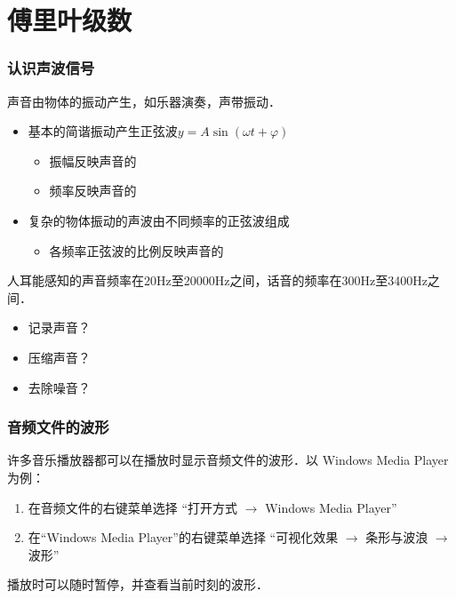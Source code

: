\documentclass[14pt,notheorems,leqno,xcolor={rgb}]{beamer} %
\begin{document}
\section{傅里叶级数}

\begin{frame}
\frametitle{认识声波信号}
声音由物体的振动产生，如乐器演奏，声带振动．\pause
\begin{itemize}
  \item 基本的简谐振动产生正弦波$y=A\sin(\omega t+\varphi)$\pause
  \begin{itemize}
    \item 振幅反映声音的%
    \item 频率\makebox[1.4em]{$\omega$}反映声音的%
  \end{itemize}\pause
  \item 复杂的物体振动的声波由不同频率的正弦波组成\pause
  \begin{itemize}
    \item 各频率正弦波的比例反映声音的%
  \end{itemize}
\end{itemize}\pause
人耳能感知的声音频率在20Hz至20000Hz之间，话音的频率在300Hz至3400Hz之间．\pause
\begin{multicols}{3}
\begin{itemize}
  \item 记录声音？\pause
  \item 压缩声音？\pause
  \item 去除噪音？
\end{itemize}
\end{multicols}
\end{frame}

\begin{rframe}
\frametitle{音频文件的波形}
许多音乐播放器都可以在播放时显示音频文件的波形．以 Windows Media Player 为例：
\begin{enumerate}
  \item 在音频文件的右键菜单选择\newline
        “打开方式 $\rightarrow$ Windows Media Player”
  \item 在“Windows Media Player”的右键菜单选择\newline
        “可视化效果 $\rightarrow$ 条形与波浪 $\rightarrow$ 波形”
\end{enumerate}
播放时可以随时暂停，并查看当前时刻的波形．
\end{rframe}
\end{document}
